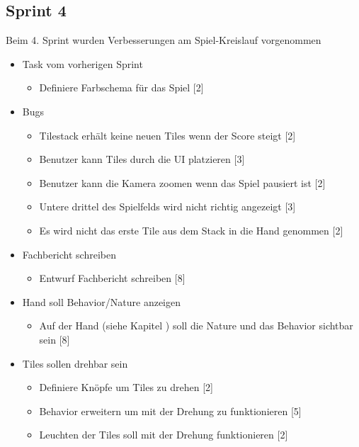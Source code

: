 \documentclass[../main.tex]{subfiles}
\begin{document}
	\newpage
	\subsection{Sprint 4}
	
	\par Beim 4. Sprint wurden Verbesserungen am Spiel-Kreislauf vorgenommen
	
	\begin{itemize}
		\item Task vom vorherigen Sprint
		\begin{itemize}
			\item Definiere Farbschema für das Spiel [2]
		\end{itemize}
	
		\item Bugs
		\begin{itemize}
			\item Tilestack erhält keine neuen Tiles wenn der Score steigt [2]
			\item Benutzer kann Tiles durch die UI platzieren [3]
			\item Benutzer kann die Kamera zoomen wenn das Spiel pausiert ist [2]
			\item Untere drittel des Spielfelds wird nicht richtig angezeigt [3]
			\item Es wird nicht das erste Tile aus dem Stack in die Hand genommen [2]
		\end{itemize}
	
		\item Fachbericht schreiben
		\begin{itemize}
			\item Entwurf Fachbericht schreiben [8]
		\end{itemize}
	
		\item Hand soll Behavior/Nature anzeigen
		\begin{itemize}
			\item Auf der Hand (siehe Kapitel ) soll die Nature und das Behavior sichtbar sein [8]
		\end{itemize}
	
		\item Tiles sollen drehbar sein
		\begin{itemize}
			\item Definiere Knöpfe um Tiles zu drehen [2]
			\item Behavior erweitern um mit der Drehung zu funktionieren [5]
			\item Leuchten der Tiles soll mit der Drehung funktionieren [2]
		\end{itemize}
	

\end{itemize}
\end{document}

